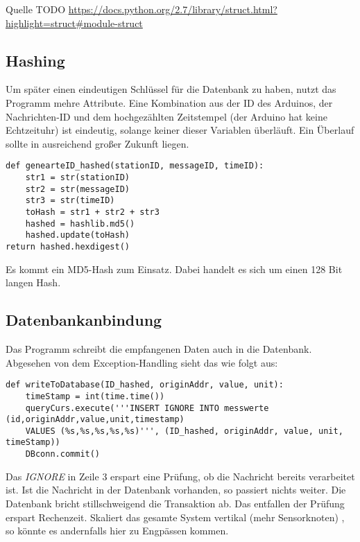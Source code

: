 Quelle TODO \url{https://docs.python.org/2.7/library/struct.html?highlight=struct#module-struct}



\subsection{Hashing}
\label{sec:hashing}
Um später einen eindeutigen Schlüssel für die Datenbank zu haben, nutzt das Programm mehre Attribute. Eine Kombination aus der ID des Arduinos, der Nachrichten-ID und dem hochgezählten Zeitstempel (der Arduino hat keine Echtzeituhr) ist eindeutig, solange keiner dieser Variablen überläuft. Ein Überlauf sollte in ausreichend großer Zukunft liegen. 

\lstset{language=python, numbers=none, breaklines=true}
\begin{lstlisting}
def genearteID_hashed(stationID, messageID, timeID):
    str1 = str(stationID)
    str2 = str(messageID)
    str3 = str(timeID)
    toHash = str1 + str2 + str3
    hashed = hashlib.md5()
    hashed.update(toHash)
return hashed.hexdigest()
\end{lstlisting}
Es kommt ein MD5-Hash zum Einsatz. Dabei handelt es sich um einen 128 Bit langen Hash. 


\subsection{Datenbankanbindung}
\label{sec:db_verbindung}
Das Programm schreibt die empfangenen Daten auch in die Datenbank. Abgesehen von dem Exception-Handling sieht das wie folgt aus: 

\lstset{language=python, numbers=left, breaklines=true}
\begin{lstlisting}
def writeToDatabase(ID_hashed, originAddr, value, unit):
    timeStamp = int(time.time())
    queryCurs.execute('''INSERT IGNORE INTO messwerte (id,originAddr,value,unit,timestamp)
	VALUES (%s,%s,%s,%s,%s)''', (ID_hashed, originAddr, value, unit, timeStamp))
	DBconn.commit()
\end{lstlisting}
Das \textit{IGNORE} in Zeile 3 erspart eine Prüfung, ob die Nachricht bereits verarbeitet ist. Ist die Nachricht in der Datenbank vorhanden, so passiert nichts weiter. Die Datenbank bricht stillschweigend die Transaktion ab. Das entfallen der Prüfung erspart Rechenzeit. Skaliert das gesamte System vertikal (mehr Sensorknoten) , so könnte es andernfalls hier zu Engpässen kommen.   

